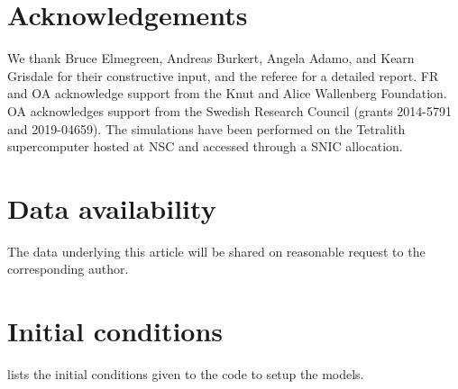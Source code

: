 \documentclass[useAMS,usenatbib]{mnras}
\begin{document}
\section*{Acknowledgements}
We thank Bruce Elmegreen, Andreas Burkert, Angela Adamo, and Kearn Grisdale for their constructive input, and the referee for a detailed report. FR and OA acknowledge support from the Knut and Alice Wallenberg Foundation. OA acknowledges support from the Swedish Research Council (grants 2014-5791 and 2019-04659). The simulations have been performed on the Tetralith supercomputer hosted at NSC and accessed through a SNIC allocation.

\section*{Data availability}
The data underlying this article will be shared on reasonable request to the corresponding author.





\appendix

\section{Initial conditions}
\label{sec:init}

 lists the initial conditions given to the \magi code to setup the models.
\end{document}
